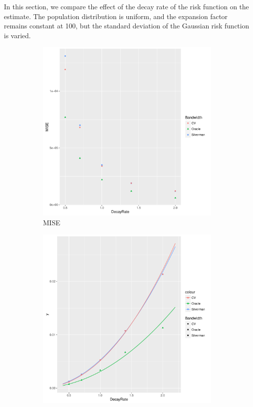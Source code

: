 In this section, we compare the effect of the decay rate of the risk function on the estimate.
The population distribution is uniform, and the expansion factor remains constant at 100, but
the standard deviation of the Gaussian risk function is varied.

\begin{figure}[htbp]
    \centering
    \begin{subfigure}[b]{0.3\textwidth}
    \includegraphics[width=\textwidth]{results/by_cases_decay/MISE-vs-risk-decay}
    \caption{MISE}
    \end{subfigure}
    \begin{subfigure}[b]{0.3\textwidth}
    \includegraphics[width=\textwidth]{results/by_cases_decay/RMISE-vs-risk-decay}

\end{subfigure}
\end{figure}
